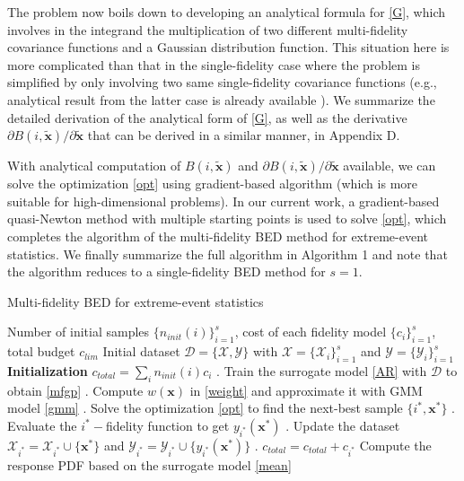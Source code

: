 \documentclass[11pt]{article}
\begin{document}
The problem now boils down to developing an analytical formula for \eqref{G}, which involves in the integrand the multiplication of two different multi-fidelity covariance functions and a Gaussian distribution function. This situation here is more complicated than that in the single-fidelity case \cite{blanchard2021output} where the problem is simplified by only involving two same single-fidelity covariance functions (e.g., analytical result from the latter case is already available \cite{mchutchon2013differentiating}). We summarize the detailed derivation of the analytical form of \eqref{G}, as well as the derivative $\partial B(i, \tilde{\mathbf{x}}) / \partial \tilde{\mathbf{x}}$ that can be derived in a similar manner, in Appendix D.

With analytical computation of $B(i, \tilde{\mathbf{x}})$ and $\partial B(i, \tilde{\mathbf{x}}) / \partial \tilde{\mathbf{x}}$ available, we can solve the optimization \eqref{opt} using gradient-based algorithm (which is more suitable for high-dimensional problems). In our current work, a gradient-based quasi-Newton method \cite{nocedal1980updating} with multiple starting points is used to solve \eqref{opt}, which completes the algorithm of the multi-fidelity BED method for extreme-event statistics. We finally summarize the full algorithm in Algorithm 1 and note that the algorithm reduces to a single-fidelity BED method for $s=1$. 

\begin{algorithm}
    \caption{Multi-fidelity BED for extreme-event statistics}
  \begin{algorithmic}
    \REQUIRE Number of initial samples $\{n_{init}(i)\}_{i=1}^{s}$, cost of each fidelity model $\{c_i\}_{i=1}^{s}$, total budget $c_{lim}$
    \INPUT Initial dataset $\mathcal{D}=\{\mathcal{X}, \mathcal{Y} \}$ with $\mathcal{X}=\{\mathcal{X}_i\}_{i=1}^{s}$ and $\mathcal{Y}=\{\mathcal{Y}_i\}_{i=1}^{s}$
    \STATE \textbf{Initialization} 
        $c_{total} = \sum_{i}  n_{init}(i) c_{i}$
      . Train the surrogate model \eqref{AR} with $\mathcal{D}$ to obtain \eqref{mfgp}
      . Compute $w(\mathbf{x})$ in \eqref{weight} and approximate it with GMM model \eqref{gmm}
      . Solve the optimization \eqref{opt} to find the next-best sample $\{i^*, \boldsymbol{x}^*\}$
      . Evaluate the $i^*-$fidelity function to get $y_{i^*}(\mathbf{x}^*)$
      . Update the dataset $\mathcal{X}_{i^*} = \mathcal{X}_{i^*} \cup  \{\boldsymbol{x}^*\}$ and $ \mathcal{Y}_{i^*} = \mathcal{Y}_{i^*} \cup \{y_{i^*}(\mathbf{x}^*)\}$
      . $c_{total} = c_{total} + c_{i^*} $
    \ENDWHILE
\OUTPUT Compute the response PDF based on the surrogate model \eqref{mean} 
  \end{algorithmic}
\label{al}
\end{algorithm}
\end{document}
